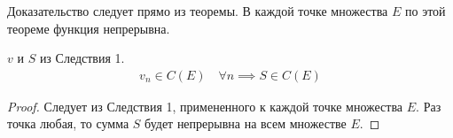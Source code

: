 \documentclass[main]{subfiles}
\begin{document}
\begin{longProof}
     Доказательство следует прямо из теоремы.
      В каждой точке множества $E$ по этой теореме функция непрерывна.
\end{longProof}
\begin{corollary}[Следствие 3]
     $v$ и $S$ из Следствия 1.
     \begin{gather*}
          v_n \in C(E) \quad \forall n \implies S \in C(E)
     \end{gather*}
\end{corollary}
\begin{proof}
     Следует из Следствия 1, примененного к каждой точке
      множества $E$. Раз точка любая, то сумма $S$ будет 
      непрерывна на всем множестве $E$.
\end{proof}
\end{document}
